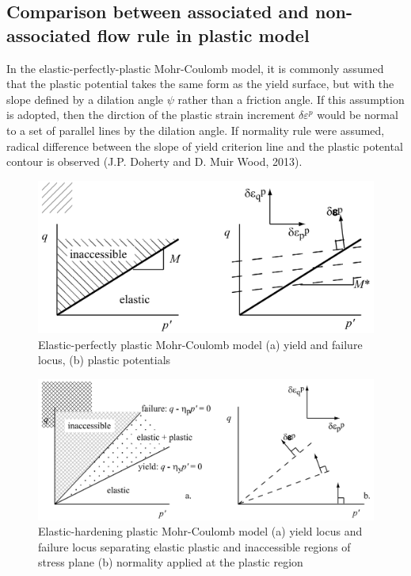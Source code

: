 \documentclass[a4paper, nobind]{templates/ociamthesis}
\begin{document}
\hypertarget{comparison-between-associated-and-non-associated-flow-rule-in-plastic-model}{%
\subsection{Comparison between associated and non-associated flow rule in plastic model}\label{comparison-between-associated-and-non-associated-flow-rule-in-plastic-model}}

In the elastic-perfectly-plastic Mohr-Coulomb model, it is commonly assumed that the plastic potential takes the same form as the yield surface, but with the slope defined by a dilation angle \(\psi\) rather than a friction angle. If this assumption is adopted, then the dirction of the plastic strain increment \(\delta \varepsilon^{p}\) would be normal to a set of parallel lines by the dilation angle. If normality rule were assumed, radical difference between the slope of yield criterion line and the plastic potental contour is observed (J.P. Doherty and D. Muir Wood, 2013).

\begin{figure}[H]
\includegraphics[width=1\linewidth]{myfigureeeeee/Elastic-perfectly plastic Mohr-Coulomb model (a) yield and failure locus, (b) plastic potentials} \caption{Elastic-perfectly plastic Mohr-Coulomb model (a) yield and failure locus, (b) plastic potentials}\label{fig:unnamed-chunk-6}
\end{figure}

\begin{figure}[H]
\includegraphics[width=1\linewidth]{myfigureeeeee/Elastic-hardening plastic Mohr-Coulomb model (a) yield locus and failure locus separating elastic plastic and inaccessible regions of stress plane (b) normality of pla} \caption{Elastic-hardening plastic Mohr-Coulomb model (a) yield locus and failure locus separating elastic plastic and inaccessible regions of stress plane (b) normality applied at the plastic region}\label{fig:unnamed-chunk-7}
\end{figure}
\end{document}
